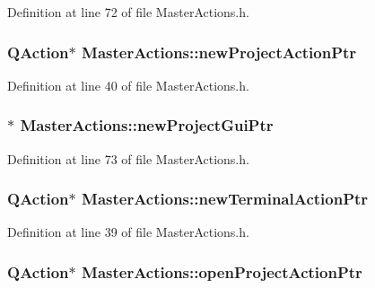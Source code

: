 Definition at line 72 of file Master\-Actions.\-h.

\hypertarget{class_master_actions_a114ab55c27fc183af68ebaaa86748a82}{
\subsubsection[{new\-Project\-Action\-Ptr}]{\setlength{\rightskip}{0pt plus 5cm}Q\-Action$\ast$ Master\-Actions\-::new\-Project\-Action\-Ptr\hspace{0.3cm}{\ttfamily [private]}}}\label{class_master_actions_a114ab55c27fc183af68ebaaa86748a82}


Definition at line 40 of file Master\-Actions.\-h.

\hypertarget{class_master_actions_a78733336a3d5fd3bbb55eaf0215f0d40}{
\subsubsection[{new\-Project\-Gui\-Ptr}]{$\ast$ Master\-Actions\-::new\-Project\-Gui\-Ptr\hspace{0.3cm}{\ttfamily [private]}}}\label{class_master_actions_a78733336a3d5fd3bbb55eaf0215f0d40}


Definition at line 73 of file Master\-Actions.\-h.

\hypertarget{class_master_actions_a6c3b1d9319fbf23f5a7cbe8305e16fc1}{
\subsubsection[{new\-Terminal\-Action\-Ptr}]{\setlength{\rightskip}{0pt plus 5cm}Q\-Action$\ast$ Master\-Actions\-::new\-Terminal\-Action\-Ptr\hspace{0.3cm}{\ttfamily [private]}}}\label{class_master_actions_a6c3b1d9319fbf23f5a7cbe8305e16fc1}


Definition at line 39 of file Master\-Actions.\-h.

\hypertarget{class_master_actions_a3b4d98cdbfaa8e287d420513a8df53ee}{
\subsubsection[{open\-Project\-Action\-Ptr}]{\setlength{\rightskip}{0pt plus 5cm}Q\-Action$\ast$ Master\-Actions\-::open\-Project\-Action\-Ptr\hspace{0.3cm}{\ttfamily [private]}}}\label{class_master_actions_a3b4d98cdbfaa8e287d420513a8df53ee}


